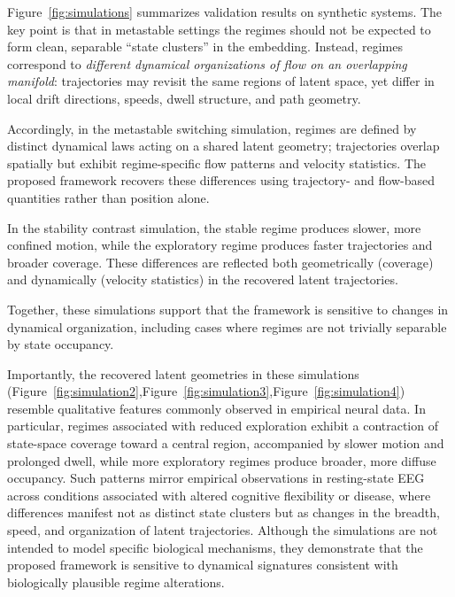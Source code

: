 \documentclass[5p,twocolumn,authoryear]{elsarticle}
\begin{document}
Figure~\ref{fig:simulations} summarizes validation results on synthetic systems. The key point is that in metastable settings the regimes should not be expected to form clean, separable ``state clusters'' in the embedding. Instead, regimes correspond to \emph{different dynamical organizations of flow on an overlapping manifold}: trajectories may revisit the same regions of latent space, yet differ in local drift directions, speeds, dwell structure, and path geometry.


Accordingly, in the metastable switching simulation, regimes are defined by distinct dynamical laws acting on a shared latent geometry; trajectories overlap spatially but exhibit regime-specific flow patterns and velocity statistics. The proposed framework recovers these differences using trajectory- and flow-based quantities rather than position alone.

In the stability contrast simulation, the stable regime produces slower, more confined motion, while the exploratory regime produces faster trajectories and broader coverage. These differences are reflected both geometrically (coverage) and dynamically (velocity statistics) in the recovered latent trajectories.

Together, these simulations support that the framework is sensitive to changes in dynamical organization, including cases where regimes are not trivially separable by state occupancy.

Importantly, the recovered latent geometries in these simulations (Figure~\ref{fig:simulation2},Figure~\ref{fig:simulation3},Figure~\ref{fig:simulation4}) resemble qualitative features commonly observed in empirical neural data. In particular, regimes associated with reduced exploration exhibit a contraction of state-space coverage toward a central region, accompanied by slower motion and prolonged dwell, while more exploratory regimes produce broader, more diffuse occupancy. Such patterns mirror empirical observations in resting-state EEG across conditions associated with altered cognitive flexibility or disease, where differences manifest not as distinct state clusters but as changes in the breadth, speed, and organization of latent trajectories. Although the simulations are not intended to model specific biological mechanisms, they demonstrate that the proposed framework is sensitive to dynamical signatures consistent with biologically plausible regime alterations.
\end{document}
